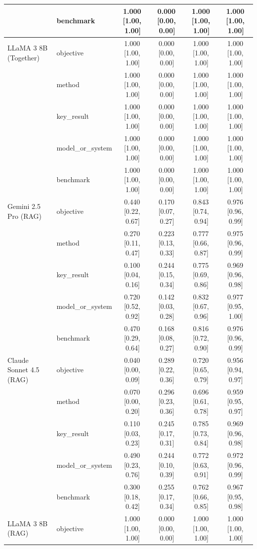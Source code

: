 {\begin{longtable}{@{}p{3.2cm}lcccc@{}}
   & benchmark & 1.000\,[1.00,\,1.00] & 0.000\,[0.00,\,0.00] & 1.000\,[1.00,\,1.00] & 1.000\,[1.00,\,1.00] \\
  \midrule
  LLaMA 3 8B (Together) & objective & 1.000\,[1.00,\,1.00] & 0.000\,[0.00,\,0.00] & 1.000\,[1.00,\,1.00] & 1.000\,[1.00,\,1.00] \\
   & method & 1.000\,[1.00,\,1.00] & 0.000\,[0.00,\,0.00] & 1.000\,[1.00,\,1.00] & 1.000\,[1.00,\,1.00] \\
   & key\_result & 1.000\,[1.00,\,1.00] & 0.000\,[0.00,\,0.00] & 1.000\,[1.00,\,1.00] & 1.000\,[1.00,\,1.00] \\
   & model\_or\_system & 1.000\,[1.00,\,1.00] & 0.000\,[0.00,\,0.00] & 1.000\,[1.00,\,1.00] & 1.000\,[1.00,\,1.00] \\
   & benchmark & 1.000\,[1.00,\,1.00] & 0.000\,[0.00,\,0.00] & 1.000\,[1.00,\,1.00] & 1.000\,[1.00,\,1.00] \\
  \midrule
  Gemini 2.5 Pro (RAG) & objective & 0.440\,[0.22,\,0.67] & 0.170\,[0.07,\,0.27] & 0.843\,[0.74,\,0.94] & 0.976\,[0.96,\,0.99] \\
   & method & 0.270\,[0.11,\,0.47] & 0.223\,[0.13,\,0.33] & 0.777\,[0.66,\,0.87] & 0.975\,[0.96,\,0.99] \\
   & key\_result & 0.100\,[0.04,\,0.16] & 0.244\,[0.15,\,0.34] & 0.775\,[0.69,\,0.86] & 0.969\,[0.96,\,0.98] \\
   & model\_or\_system & 0.720\,[0.52,\,0.92] & 0.142\,[0.03,\,0.28] & 0.832\,[0.67,\,0.96] & 0.977\,[0.95,\,1.00] \\
   & benchmark & 0.470\,[0.29,\,0.64] & 0.168\,[0.08,\,0.27] & 0.816\,[0.72,\,0.90] & 0.976\,[0.96,\,0.99] \\
  \midrule
  Claude Sonnet 4.5 (RAG) & objective & 0.040\,[0.00,\,0.09] & 0.289\,[0.22,\,0.36] & 0.720\,[0.65,\,0.79] & 0.956\,[0.94,\,0.97] \\
   & method & 0.070\,[0.00,\,0.20] & 0.296\,[0.23,\,0.36] & 0.696\,[0.61,\,0.78] & 0.959\,[0.95,\,0.97] \\
   & key\_result & 0.110\,[0.03,\,0.23] & 0.245\,[0.17,\,0.31] & 0.785\,[0.73,\,0.84] & 0.969\,[0.96,\,0.98] \\
   & model\_or\_system & 0.490\,[0.23,\,0.76] & 0.244\,[0.10,\,0.39] & 0.772\,[0.63,\,0.91] & 0.972\,[0.96,\,0.99] \\
   & benchmark & 0.300\,[0.18,\,0.42] & 0.255\,[0.17,\,0.34] & 0.762\,[0.66,\,0.85] & 0.967\,[0.95,\,0.98] \\
  \midrule
  LLaMA 3 8B (RAG) & objective & 1.000\,[1.00,\,1.00] & 0.000\,[0.00,\,0.00] & 1.000\,[1.00,\,1.00] & 1.000\,[1.00,\,1.00] \\

\end{longtable}}
